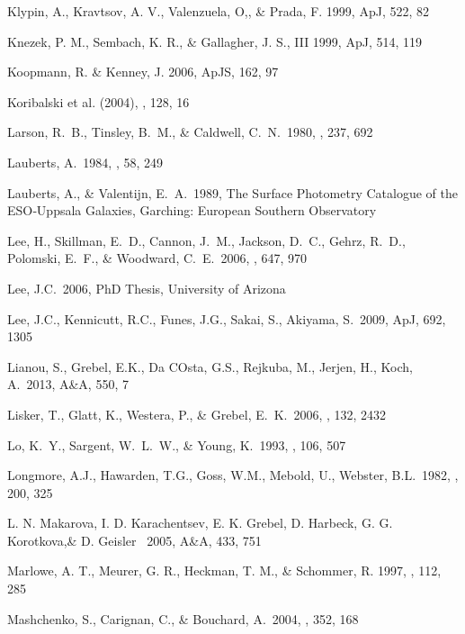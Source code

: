 \documentclass[12pt,preprint]{emulateapj}
\begin{document}
\begin{thebibliography}{}
Klypin, A., Kravtsov, A. V., Valenzuela, O,, \& Prada, F. 1999, ApJ, 522, 82

Knezek, P. M., Sembach, K. R., \& Gallagher, J. S., III 1999, ApJ, 514, 119

Koopmann, R. \& Kenney, J. 2006, ApJS, 162, 97

Koribalski et al. (2004),  \aj, 128, 16

Larson, R.~B., Tinsley, B.~M., \& Caldwell, C.~N.\ 1980, \apj, 237, 692 

Lauberts, A.\ 1984, \aaps, 58, 249 

Lauberts, A., \& Valentijn, E.~A.\ 1989,
The Surface Photometry Catalogue of the ESO‐Uppsala Galaxies,
Garching: European Southern Observatory  

Lee, H., Skillman, E.~D., Cannon, J.~M., Jackson, D.~C., Gehrz, R.~D., 
Polomski, E.~F., \& Woodward, C.~E.\ 2006, \apj, 647, 970 

Lee, J.C.\ 2006, PhD Thesis, University of Arizona

Lee, J.C., Kennicutt, R.C., Funes, J.G., Sakai, S., Akiyama, S.\ 2009, ApJ, 692, 1305

Lianou, S., Grebel, E.K., Da COsta, G.S., Rejkuba, M., Jerjen, H., Koch, A.\ 2013, A\&A, 550, 7

Lisker, T., Glatt, K., Westera, P., \& Grebel, E.~K.\ 2006, \aj, 132, 2432

Lo, K.~Y., Sargent, W.~L.~W., \& Young, K.\ 1993, \aj, 106, 507 

Longmore, A.J., Hawarden, T.G., Goss, W.M., Mebold, U., Webster, B.L.\ 1982, \mnras, 200, 325

L. N. Makarova, I. D. Karachentsev, E. K. Grebel, D. Harbeck, G. G. Korotkova,\&
D. Geisler \ 2005, A\&A, 433, 751

Marlowe, A. T., Meurer, G. R., Heckman, T. M., \& Schommer, R. 1997, 
\apjs , 112, 285

Mashchenko, S., Carignan, C., \& Bouchard, A.\ 2004, \mnras, 352, 168 


\end{thebibliography}
\end{document}
